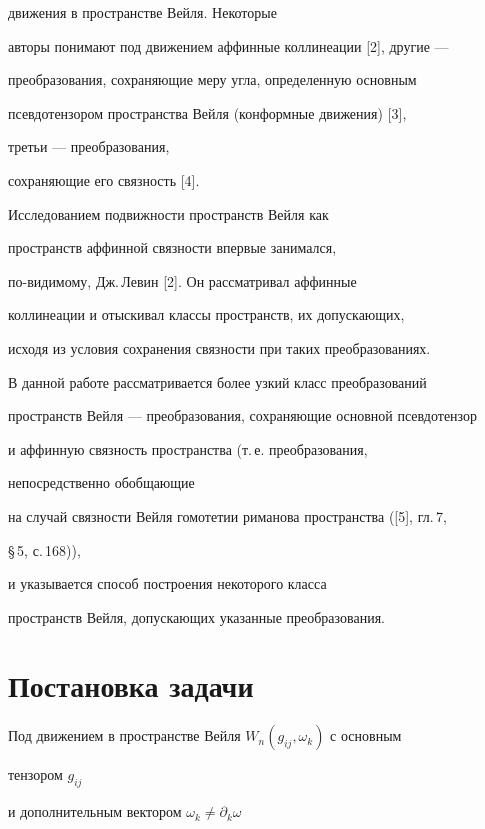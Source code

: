 движения в пространстве Вейля. Некоторые 


авторы понимают под движением аффинные коллинеации [2], другие --- 


преобразования, сохраняющие меру угла, определенную основным 


псевдотензором пространства Вейля (конформные движения) [3], 


третьи --- преобразования, 


сохраняющие его связность [4]. 


 


Исследованием подвижности пространств Вейля как 


пространств аффинной связности впервые занимался,


по-видимому, Дж.\,Левин [2]. Он рассматривал аффинные 


коллинеации и отыскивал классы пространств, их допускающих, 


исходя из условия сохранения связности при таких преобразованиях. 


 


В данной работе рассматривается более узкий класс преобразований 


пространств Вейля --- преобразования, сохраняющие основной псевдотензор 


и аффинную связность пространства (т.\,е. преобразования, 


непосредственно обобщающие 


на случай связности Вейля гомотетии риманова пространства ([5], гл.\,7, 


\S\,5, с.\,168)), 


и указывается способ построения некоторого класса 


пространств Вейля, допускающих указанные преобразования. 


 


\section{Постановка задачи} 


 


Под движением в пространстве Вейля $W_n(g_{ij},\omega_k)$ с основным 


тензором $g_{ij}$ 


и дополнительным вектором $\omega_k\ne\partial_k\omega$ 


